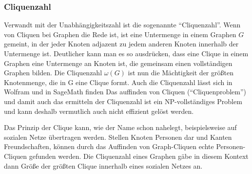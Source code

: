 \documentclass[a4paper,12pt,ngerman,chapterprefix=false,listof=totoc,bibliography=totoc]{scrreprt}
\begin{document}
{\subsubsection*{Cliquenzahl}
{
Verwandt mit der Unabhängigkeitszahl ist die sogenannte "`Cliquenzahl"'. Wenn von Cliquen bei Graphen die Rede ist, ist eine Untermenge in einem Graphen \(G\) gemeint, in der jeder Knoten adjazent zu jedem anderen Knoten innerhalb der Untermenge ist. Deutlicher kann man es so ausdrücken, dass eine Clique in einem Graphen eine Untermenge an Knoten ist, die gemeinsam einen vollständigen Graphen bilden. Die Cliquenzahl \(\omega(G)\) ist nun die Mächtigkeit der größten Knotenmenge, die in G eine Clique formt. \cite{diestel_graphentheorie_2000} Auch die Cliquenzahl lässt sich in Wolfram und in SageMath finden \cite{wolfram_research_findclique_2015,sagemath_graph_2020} Das auffinden von Cliquen ("`Cliquenproblem"') und damit auch das ermitteln der Cliquenzahl ist ein NP-vollständiges Problem und kann deshalb vermutlich auch nicht effizient gelöst werden.

Das Prinzip der Clique kann, wie der Name schon nahelegt, beispielsweise auf sozialen Netze übertragen werden. Stellen Knoten Personen dar und Kanten Freundschaften, können durch das Auffinden von Graph-Cliquen echte Personen-Cliquen gefunden werden. Die Cliquenzahl eines Graphen gäbe in diesem Kontext dann Größe der größten Clique innerhalb eines sozialen Netzes an.
}
}
\end{document}
